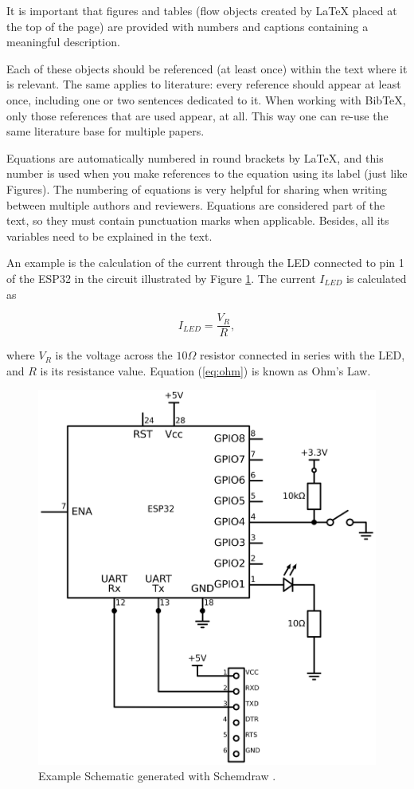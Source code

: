 \documentclass[conference]{IEEEtran}
\begin{document}
\noindent It is important that figures and tables (flow objects created by LaTeX
placed at the top of the page) are provided with numbers and captions containing a meaningful description.

Each of these objects should be referenced (at least once) within the text where it is relevant.
The same applies to literature: every reference should appear at least once, including
one or two sentences dedicated to it. When working with BibTeX, only
those references that are used appear, at all. This way one can re-use the same literature base for multiple papers.

Equations are automatically numbered in round brackets by LaTeX, and this number is used when you make references to the equation using its label (just like Figures). The numbering of equations is very helpful for sharing when writing between multiple authors and reviewers. Equations are considered part of the text, so they must contain punctuation marks when applicable. Besides, all its variables need to be explained in the text. 

An example is the calculation of the current through the LED connected to pin 1 of the ESP32 in the circuit illustrated by Figure \ref{Fig:schematics}. The current $I_{LED}$ is calculated as

\begin{equation}
I_{LED} = \frac{V_{R}}{R},
\label{eq:ohm}
\end{equation}

\noindent where $V_{R}$ is the voltage across the $10 {\Omega}$ resistor connected in series with the LED, and $R$ is its resistance value. Equation (\ref{eq:ohm}) is known as Ohm's Law.


\begin{figure}
  \centering
  \includegraphics[width=0.9\columnwidth]{schematic.png}
  \caption{Example Schematic generated with Schemdraw \cite{schem}\label{schematic}.}
  \label{Fig:schematics}
\end{figure}
\end{document}
